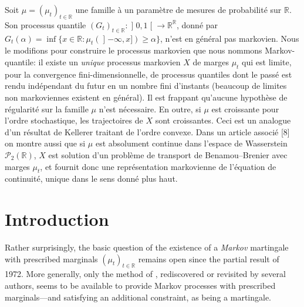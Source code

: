 \documentclass[JEP,XML,SOM,Unicode,NoEqCountersInSection,NoFloatCountersInSection,published]{cedram}
\theoremstyle{plain}
\theoremstyle{definition}
\newcommand{\R}{\mathbb{R}}
\begin{document}


\begin{altabstract}
Soit $\mu=(\mu_t)_{t\in \mathbb{R}}$ une famille à un paramètre de mesures de probabilité sur $\mathbb{R}$. Son processus quantile $(G_t)_{t\in\mathbb{R}}:\mathopen]0,1\mathclose[\to\mathbb{R}^\mathbb{R}$, donné par $G_t(\alpha)=\inf\{x\in\mathbb{R}:\mu_t(\mathopen]-\infty,x\mathclose])\geqslant\alpha\}$, n'est en général pas markovien.
Nous le modifions pour construire le processus markovien que nous nommons \og Markov-quantile\fg:
il existe un \emph{unique} processus markovien $X$ de marges $\mu_t$ qui est limite, pour la convergence fini-dimensionnelle, de processus quantiles dont le passé est rendu indépendant du futur en un nombre fini d'instants (beaucoup de limites non markoviennes existent en général). Il est frappant qu'aucune hypothèse de régularité sur la famille $\mu$ n'est nécessaire.
En outre, si $\mu$ est croissante pour l'ordre stochastique, les trajectoires de $X$ sont croissantes. Ceci est un analogue d'un résultat de Kellerer traitant de l'ordre convexe.
Dans un article associé [8] on montre aussi que si $\mu$ est absolument continue dans l'espace de Wasserstein $\mathcal{P}_2(\mathbb{R})$, $X$ est solution d'un problème de transport de Benamou--Brenier avec marges $\mu_t$, et fournit donc une représentation markovienne de l'équation de continuité, unique dans le sens donné plus haut.
\end{altabstract}

\maketitle
\vspace*{-2\baselineskip}
\tableofcontents
\mainmatter

\section{Introduction}\label{sec:intro}
Rather surprisingly, the basic question of the existence of a \emph{Markov} martingale with prescribed marginals $(\mu_t)_{t\in\R}$ remains open since the partial result \cite{Ke72} of 1972. More generally, only the method of \cite{Ke72}, rediscovered or revisited by several authors, seems to be available to provide Markov processes with prescribed marginals---and satisfying an additional constraint, as being a martingale.
\end{document}
